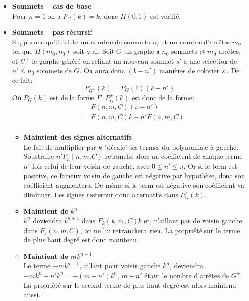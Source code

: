 \begin{itemize}
\item \textbf{Sommets -- cas de base} \\
Pour $n = 1$ on a $P_G(k) = k$, donc $H(0,1)$ est vérifié.
\item \textbf{Sommets -- pas récursif} \\ Supposons qu'il existe un nombre de sommets $n_0$ et un nombre d'arrêtes $m_0$ tel que $H(m_0,n_0)$ soit vrai. Soit $G$ un graphe à $n_0$ sommets et $m_0$ arrêtes, et $G^+$ le graphe généré en reliant un nouveau sommet $s'$ à une selection de $n' \leq n_0$ sommets de $G$. On aura donc $(k-n')$ manières de colorier $s'$. De ce fait:
\[ P_{G^+}(k) = P_G(k)(k-n') \]
Où $P_G(k)$ est de la forme $F$. $P_G^+(k)$ est donc de la forme:
\begin{eqnarray*}
&&	F(n,m,C)(k-n')			\\
&=& F(n,m,C)k - n'F(n,m,C)	\\
\end{eqnarray*} 
\begin{itemize}
\item \textbf{Maintient des signes alternatifs} \\ 
Le fait de multiplier par $k$ "décale" les termes du polynomiale à gauche. Soustraire $n'F_k(n,m,C)$ retranche alors au coéfficient de chaque terme $n'$ fois celui de leur voisin de gauche, avec $0 \leq n' \leq n$. Or si le term est positive, ce fameux voisin de gauche est négative par hypothèse, donc son coéfficient augmentera. De même si le term est négative son coéfficient va diminuer. Les signes resteront donc alternatifs dans $P_G^+(k)$.
\item \textbf{Maintient de $k^n$} \\
$k^{n}$ deviendra $k^{n+1}$ dans $F_k(n,m,C)k$ et, n'aillant pas de voisin gauche dans $F_k(n,m,C)$, on ne lui retranchera rien. La propriété sur le terme de plus haut degré est donc maintenu.
\item \textbf{Maintient de $mk^{n-1}$} \\
Le terme $-mk^{n-1}$, aillant pour voisin gauche $k^n$, deviendra $-mk^n - n'k^n = -(m+n')k^n$, $m+n'$ étant le nombre d'arrêtes de $G^+$. La propriété sur le second terme de plus haut degré est alors maintenu aussi.
\end{itemize}


\end{itemize}
